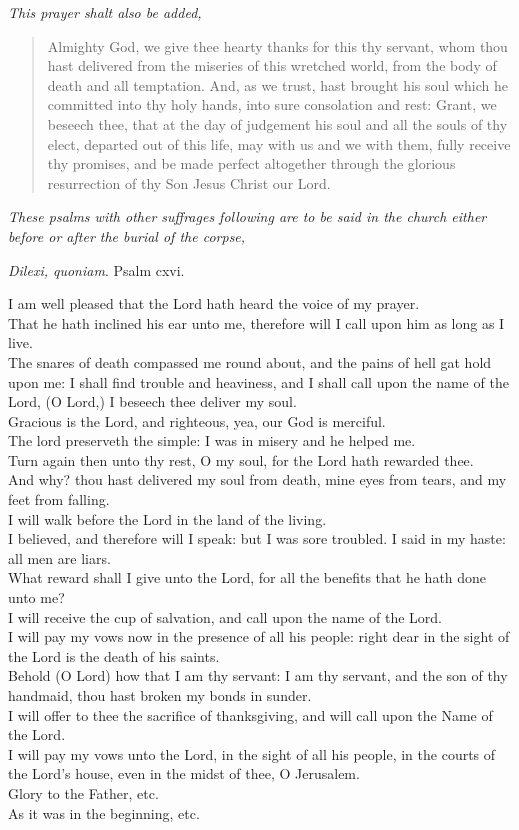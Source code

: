 \documentclass[
]{book}
\begin{document}
\emph{This prayer shalt also be added,}

\begin{quote}
Almighty God, we give thee hearty thanks for this thy servant, whom thou hast delivered from the miseries of this wretched world, from the body of death and all temptation. And, as we trust, hast brought his soul which he committed into thy holy hands, into sure consolation and rest: Grant, we beseech thee, that at the day of judgement his soul and all the souls of thy elect, departed out of this life, may with us and we with them, fully receive thy promises, and be made perfect altogether through the glorious resurrection of thy Son Jesus Christ our Lord.
\end{quote}

\emph{These psalms with other suffrages following are to be said in the church either before or after the burial of the corpse,}

\emph{Dilexi, quoniam}. Psalm cxvi.

I am well pleased that the Lord hath heard the voice of my prayer.\\
That he hath inclined his ear unto me, therefore will I call upon him as long as I live.\\
The snares of death compassed me round about, and the pains of hell gat hold upon me: I shall find trouble and heaviness, and I shall call upon the name of the Lord, (O Lord,) I beseech thee deliver my soul.\\
Gracious is the Lord, and righteous, yea, our God is merciful.\\
The lord preserveth the simple: I was in misery and he helped me.\\
Turn again then unto thy rest, O my soul, for the Lord hath rewarded thee.\\
And why? thou hast delivered my soul from death, mine eyes from tears, and my feet from falling.\\
I will walk before the Lord in the land of the living.\\
I believed, and therefore will I speak: but I was sore troubled. I said in my haste: all men are liars.\\
What reward shall I give unto the Lord, for all the benefits that he hath done unto me?\\
I will receive the cup of salvation, and call upon the name of the Lord.\\
I will pay my vows now in the presence of all his people: right dear in the sight of the Lord is the death of his saints.\\
Behold (O Lord) how that I am thy servant: I am thy servant, and the son of thy handmaid, thou hast broken my bonds in sunder.\\
I will offer to thee the sacrifice of thanksgiving, and will call upon the Name of the Lord.\\
I will pay my vows unto the Lord, in the sight of all his people, in the courts of the Lord's house, even in the midst of thee, O Jerusalem.\\
Glory to the Father, etc.\\
As it was in the beginning, etc.
\end{document}
